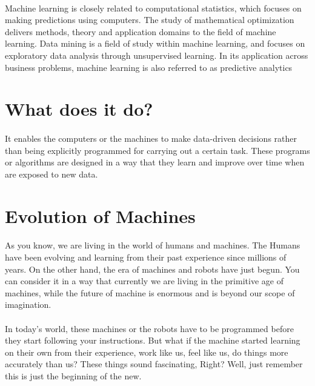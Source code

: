 \documentclass{report}
\begin{document}
\paragraph{}Machine learning is closely related to computational statistics, which focuses on making predictions using computers. The study of mathematical optimization delivers methods, theory and application domains to the field of machine learning. Data mining is a field of study within machine learning, and focuses on exploratory data analysis through unsupervised learning. In its application across business problems, machine learning is also referred to as predictive analytics

\section{What does it do? }

\paragraph{}It enables the computers or the machines to make data-driven decisions rather than being explicitly programmed for carrying out a certain task. These programs or algorithms are designed in a way that they learn and improve over time when are exposed to new data.

\section{Evolution of Machines}
\paragraph{}As you know, we are living in the world of humans and machines. The Humans have been evolving and learning from their past experience since millions of years. On the other hand, the era of machines and robots have just begun. You can consider it in a way that currently we are living in the primitive age of machines, while the future of machine is enormous and is beyond our scope of imagination.
\paragraph{}In today’s world, these machines or the robots have to be programmed before they start following your instructions. But what if the machine started learning on their own from their experience, work like us, feel like us, do things more accurately than us? These things sound fascinating, Right? Well, just remember this is just the beginning of the new. 
\end{document}
